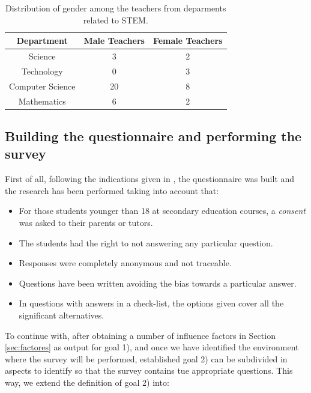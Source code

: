 \documentclass[journal,transmag]{IEEEtran}
\begin{document}
\begin{table}
	\caption[Teachers in STEM departments]{Distribution of gender among the teachers from deparments related to STEM.}
	\label{tab:teachers}
	
	\begin{center}
		\begin{tabular}{|c|c|c|}
			\hline
			\textbf{Department} & \textbf{Male Teachers} & \textbf{Female Teachers} \\ \hline
			Science & 3 & 2 \\ \hline
			Technology & 0 & 3 \\ \hline
			Computer Science & 20 & 8 \\ \hline
			Mathematics & 6 & 2 \\
			\hline
		\end{tabular}
	\end{center}
\end{table}

\subsection{Building the questionnaire and performing the survey}

First of all, following the indications given in \cite{cohen2013research}, the questionnaire was built and the research has been performed taking into account that:

\begin{itemize}
  \item For those students younger than 18 at secondary education courses, a \textit{consent} was asked to their parents or tutors.
  \item The students had the right to not answering any particular question.
  \item Responses were completely anonymous and not traceable.
  \item Questions have been written avoiding the bias towards a particular answer.
  \item In questions with answers in a check-list, the options given cover all the significant alternatives.
\end{itemize}

To continue with, after obtaining a number of influence factors in Section \ref{sec:factores} as output for goal 1), and once we have identified the environment where the survey will be performed, established goal 2) can be subdivided in aspects to identify so that the survey contains tue appropriate questions. This way, we extend the definition of goal 2) into:
\end{document}
